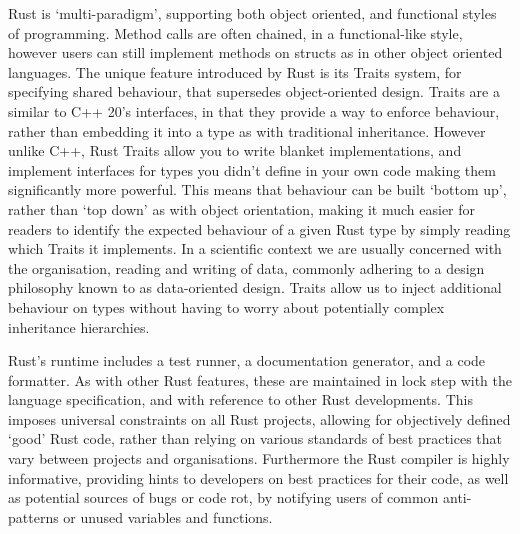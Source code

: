 Rust is `multi-paradigm', supporting both object oriented, and functional styles of programming. Method calls are often chained, in a functional-like style, however users can still implement methods on structs as in other object oriented languages. The unique feature introduced by Rust is its Traits system, for specifying shared behaviour, that supersedes object-oriented design. Traits are a similar to C++ 20's interfaces, in that they provide a way to enforce behaviour, rather than embedding it into a type as with traditional inheritance. However unlike C++, Rust Traits allow you to write blanket implementations, and implement interfaces for types you didn't define in your own code making them significantly more powerful. This means that behaviour can be built `bottom up', rather than `top down' as with object orientation, making it much easier for readers to identify the expected behaviour of a given Rust type by simply reading which Traits it implements. In a scientific context we are usually concerned with the organisation, reading and writing of data, commonly adhering to a design philosophy known to as data-oriented design. Traits allow us to inject additional behaviour on types without having to worry about potentially complex inheritance hierarchies.

Rust's runtime includes a test runner, a documentation generator, and a code formatter. As with other Rust features, these are maintained in lock step with the language specification, and with reference to other Rust developments. This imposes universal constraints on all Rust projects, allowing for objectively defined `good' Rust code, rather than relying on various standards of best practices that vary between projects and organisations. Furthermore the Rust compiler is highly informative, providing hints to developers on best practices for their code, as well as potential sources of bugs or code rot, by notifying users of common anti-patterns or unused variables and functions.

